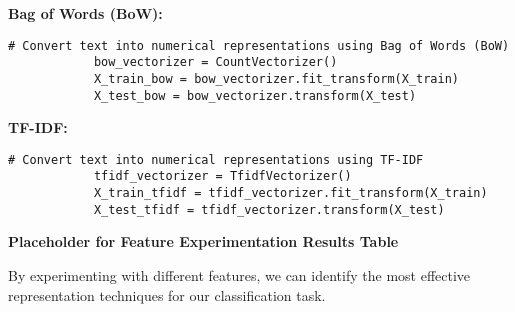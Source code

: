         \textbf{Bag of Words (BoW):}
        
        \vspace{0.5em}

        \begin{lstlisting}[caption={Convert text using Bag of Words (BoW)}, label={lst:bow_conversion}]
            # Convert text into numerical representations using Bag of Words (BoW)
            bow_vectorizer = CountVectorizer()
            X_train_bow = bow_vectorizer.fit_transform(X_train)
            X_test_bow = bow_vectorizer.transform(X_test)
        \end{lstlisting}

        \textbf{TF-IDF:}
        
        \vspace{0.5em}

        \begin{lstlisting}[caption={Convert text using TF-IDF}, label={lst:tfidf_conversion}]
            # Convert text into numerical representations using TF-IDF
            tfidf_vectorizer = TfidfVectorizer()
            X_train_tfidf = tfidf_vectorizer.fit_transform(X_train)
            X_test_tfidf = tfidf_vectorizer.transform(X_test)
        \end{lstlisting}

        \textbf{Placeholder for Feature Experimentation Results Table}

        By experimenting with different features, we can identify the most effective representation techniques for our classification task.
